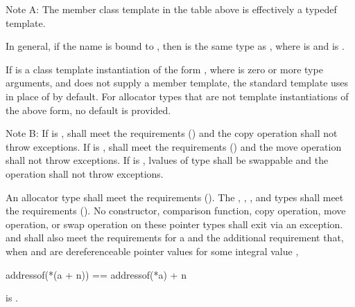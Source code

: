 \pnum
Note A: The member class template  in the table above is
effectively a typedef template. \begin{note} In general, if
the name  is bound to , then
 is the same type as
, where
 is  and
 is . \end{note} If
 is a class template instantiation of the form
, where  is zero or more type
arguments, and  does not supply a  member
template, the standard  template uses
 in place of 
by default. For allocator types that are not template instantiations of the
above form, no default is provided.

\pnum
Note B:
If  is ,
 shall meet the
 requirements ()
and the copy operation shall not throw exceptions.
If  is ,
 shall meet the
 requirements ()
and the move operation shall not throw exceptions.
If  is ,
lvalues of type  shall be swappable
and the  operation shall not throw exceptions.

\pnum
An allocator type  shall meet the
 requirements ().
The , , , and
 types shall meet the
 requirements ().
No constructor,
comparison function, copy operation, move operation, or swap operation on
these pointer types shall exit via an exception.  and  shall also
meet the requirements for
a  and
the additional requirement that, when  and  are
dereferenceable pointer values for some integral value ,
\begin{codeblock}
addressof(*(a + n)) == addressof(*a) + n
\end{codeblock}
is .

